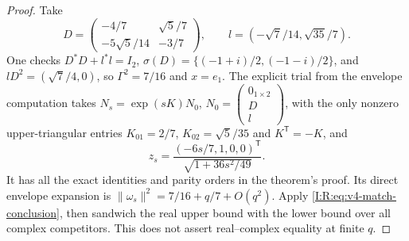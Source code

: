 \begin{proof}
Take
\[
 D=\begin{pmatrix}-4/7&\sqrt5/7\\-5\sqrt5/14&-3/7\end{pmatrix},
 \qquad l=(-\sqrt7/14,\sqrt{35}/7).
\]
One checks $D^*D+l^*l=I_2$, $\sigma(D)=\{(-1+i)/2,(-1-i)/2\}$,
and $lD^2=(\sqrt7/4,0)$, so $\Gamma^2=7/16$ and $x=e_1$.
The explicit trial from the envelope computation takes
$N_s=\exp(sK)N_0$, $N_0=\begin{pmatrix}0_{1\times2}\\D\\l\end{pmatrix}$,
with the only nonzero upper-triangular entries
$K_{01}=2/7$, $K_{02}=\sqrt5/35$ and $K^{\mathsf T}=-K$, and
\[
 z_s=\frac{(-6s/7,1,0,0)^{\mathsf T}}
                   {\sqrt{1+36s^2/49}}.
\]
It has all the exact identities and parity orders in the theorem's
proof.  Its direct envelope expansion is
$\|\omega_s\|^2=7/16+q/7+O(q^2)$.
Apply \eqref{I:R:eq:v4-match-conclusion}, then sandwich the real upper
bound with the lower bound over all complex competitors.
This does not assert real--complex equality at finite $q$.
\end{proof}
